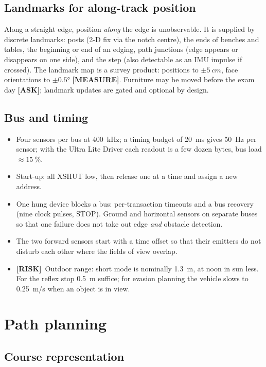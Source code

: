 \documentclass[11pt,a4paper]{article}
\newcommand{\mk}[2]{\textsf{\scriptsize\bfseries\colorbox{#1bg}{\color{#1}[#2]}}}
\newcommand{\MEASURE}{\mk{warn}{MEASURE}}
\newcommand{\ASK}{\mk{good}{ASK}}
\newcommand{\RISK}{\mk{bad}{RISK}}
\begin{document}
\subsection{Landmarks for along-track position}

Along a straight edge, position \emph{along} the edge is unobservable. It is
supplied by discrete landmarks: posts (2-D fix via the notch centre), the ends
of benches and tables, the beginning or end of an edging, path junctions (edge
appears or disappears on one side), and the step (also detectable as an IMU
impulse if crossed). The landmark map is a survey product: positions to
$\pm\qty{5}{cm}$, face orientations to $\pm\ang{0.5}$ \MEASURE. Furniture may be
moved before the exam day \ASK; landmark updates are gated and optional by
design.

\subsection{Bus and timing}

\begin{itemize}[leftmargin=6mm]
\item Four sensors per bus at \qty{400}{kHz}; a timing budget of \qty{20}{ms}
gives \qty{50}{Hz} per sensor; with the Ultra Lite Driver each readout is a few
dozen bytes, bus load $\approx\qty{15}{\percent}$.
\item Start-up: all XSHUT low, then release one at a time and assign a new address.
\item One hung device blocks a bus: per-transaction timeouts and a bus recovery
(nine clock pulses, STOP). Ground and horizontal sensors on separate buses so
that one failure does not take out edge \emph{and} obstacle detection.
\item The two forward sensors start with a time offset so that their emitters
do not disturb each other where the fields of view overlap.
\item \RISK\ Outdoor range: short mode is nominally \qty{1.3}{m}, at noon in
sun less. For the reflex stop \qty{0.5}{m} suffice; for evasion planning the
vehicle slows to \qty{0.25}{m/s} when an object is in view.
\end{itemize}
\clearpage
\section{Path planning}\label{sec:planning}

\subsection{Course representation}
\end{document}
